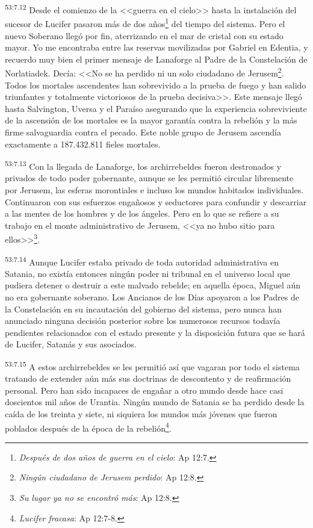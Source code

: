 \par
\textsuperscript{53:7.12} Desde el comienzo de la <<guerra en el cielo>> hasta la instalación del sucesor de Lucifer pasaron más de dos años\footnote{\textit{Después de dos años de guerra en el cielo}: Ap 12:7.} del tiempo del sistema. Pero el nuevo Soberano llegó por fin, aterrizando en el mar de cristal con su estado mayor. Yo me encontraba entre las reservas movilizadas por Gabriel en Edentia, y recuerdo muy bien el primer mensaje de Lanaforge al Padre de la Constelación de Norlatiadek. Decía: <<No se ha perdido ni un solo ciudadano de Jerusem\footnote{\textit{Ningún ciudadano de Jerusem perdido}: Ap 12:8.}. Todos los mortales ascendentes han sobrevivido a la prueba de fuego y han salido triunfantes y totalmente victoriosos de la prueba decisiva>>. Este mensaje llegó hasta Salvington, Uversa y el Paraíso asegurando que la experiencia sobreviviente de la ascensión de los mortales es la mayor garantía contra la rebelión y la más firme salvaguardia contra el pecado. Este noble grupo de Jerusem ascendía exactamente a 187.432.811 fieles mortales.

\par
\textsuperscript{53:7.13} Con la llegada de Lanaforge, los archirrebeldes fueron destronados y privados de todo poder gobernante, aunque se les permitió circular libremente por Jerusem, las esferas morontiales e incluso los mundos habitados individuales. Continuaron con sus esfuerzos engañosos y seductores para confundir y descarriar a las mentes de los hombres y de los ángeles. Pero en lo que se refiere a su trabajo en el monte administrativo de Jerusem, <<ya no hubo sitio para ellos>>\footnote{\textit{Su lugar ya no se encontró más}: Ap 12:8.}.

\par
\textsuperscript{53:7.14} Aunque Lucifer estaba privado de toda autoridad administrativa en Satania, no existía entonces ningún poder ni tribunal en el universo local que pudiera detener o destruir a este malvado rebelde; en aquella época, Miguel aún no era gobernante soberano. Los Ancianos de los Días apoyaron a los Padres de la Constelación en su incautación del gobierno del sistema, pero nunca han anunciado ninguna decisión posterior sobre los numerosos recursos todavía pendientes relacionados con el estado presente y la disposición futura que se hará de Lucifer, Satanás y sus asociados.

\par
\textsuperscript{53:7.15} A estos archirrebeldes se les permitió así que vagaran por todo el sistema tratando de extender aún más sus doctrinas de descontento y de reafirmación personal. Pero han sido incapaces de engañar a otro mundo desde hace casi doscientos mil años de Urantia. Ningún mundo de Satania se ha perdido desde la caída de los treinta y siete, ni siquiera los mundos más jóvenes que fueron poblados después de la época de la rebelión\footnote{\textit{Lucifer fracasa}: Ap 12:7-8.}.

